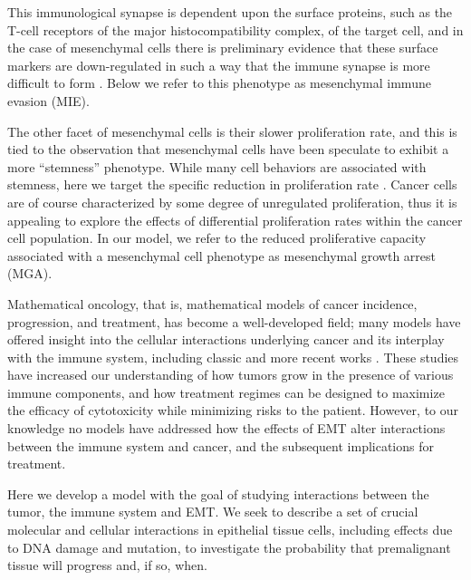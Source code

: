 \documentclass[11pt]{article}
\begin{document}
This immunological synapse is dependent upon the surface proteins, such as the T-cell receptors of the major histocompatibility complex, of the target cell, and in the case of mesenchymal cells there is preliminary evidence that these surface markers are down-regulated in such a way that the immune synapse is more difficult to form \cite{terry2017new}.
Below we refer to this phenotype as mesenchymal immune evasion (MIE).
\par
The other facet of mesenchymal cells is their slower proliferation rate, and this is tied to the observation that mesenchymal cells have been speculate to exhibit a more ``stemness'' phenotype.
While many cell behaviors are associated with stemness, here we target the specific reduction in proliferation rate \cite{woods2014effects}.
Cancer cells are of course characterized by some degree of unregulated proliferation, thus it is appealing to explore the effects of differential proliferation rates within the cancer cell population.
In our model, we refer to the reduced proliferative capacity associated with a mesenchymal cell phenotype as mesenchymal growth arrest (MGA).
\par
Mathematical oncology, that is, mathematical models of cancer incidence, progression, and treatment, has become a well-developed field; many models have offered insight into the cellular interactions underlying cancer and its interplay with the immune system, including classic \cite{anderson98_continuous, sherrattjonathana.92_oncogenes, pillis05_validated} and more recent works \cite{kim18_cell, gallaher14_bridging, gallaher18_spatial, an15_agentbased, serre16_mathematical, louzoun14_mathematical, briones-orta13_arkadia, lavi13_role, greene15_modeling, greene16_mathematical, cho17_modeling-1,  benzekry17_mathematical, owen11_mathematical, west18_multidrug}. These studies have increased our understanding of how tumors grow in the presence of various immune components, and how treatment regimes can be designed to maximize the efficacy of cytotoxicity while minimizing risks to the patient. However, to our knowledge no models have addressed how the effects of EMT alter interactions between the immune system and cancer, and the subsequent implications for treatment. 
\par
Here we develop a model with the goal of studying interactions between the tumor, the immune system and EMT.
We seek to describe a set of crucial molecular and cellular interactions in epithelial tissue cells, including effects due to DNA damage and mutation, to investigate the probability that premalignant tissue will progress and, if so, when.
\end{document}
